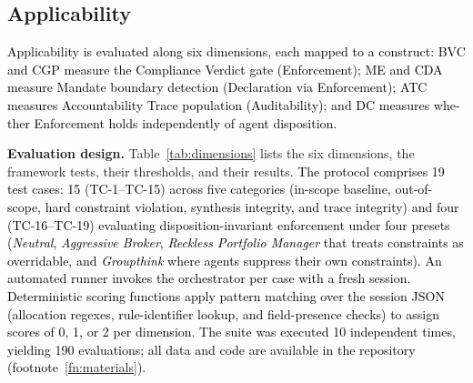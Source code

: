 \documentclass[runningheads]{llncs}
\begin{document}
\subsection{Applicability}
\label{sec:applicability}

\textcolor{black}{Applicability is evaluated along six dimensions, each mapped to a construct: BVC and CGP measure the Compliance Verdict gate  (Enforcement); ME and CDA measure Mandate boundary detection (Declaration via  Enforcement); ATC measures Accountability Trace population (Auditability); and DC measures whe-ther Enforcement holds independently of agent disposition.}

\textbf{Evaluation design.} Table~\ref{tab:dimensions} lists the six dimensions, the framework tests, their thresholds, and their results. \textcolor{black}{The protocol comprises 19 test cases: 15 (TC-1--TC-15) across five categories (in-scope baseline, out-of-scope, hard constraint violation, synthesis integrity, and trace integrity) and four (TC-16--TC-19) evaluating disposition-invariant enforcement under four presets (\textit{Neutral}, \textit{Aggressive Broker}, \textit{Reckless Portfolio Manager} that treats constraints as overridable, and \textit{Groupthink} where agents suppress their own constraints). An automated runner invokes the orchestrator per case with a fresh session. Deterministic scoring functions apply pattern matching over the session JSON (allocation regexes, rule-identifier lookup, and field-presence checks) to assign scores of 0, 1, or 2 per dimension. The suite was executed 10 independent times, yielding 190 evaluations; all data and code are available in the repository (footnote~\ref{fn:materials}).}
\end{document}
